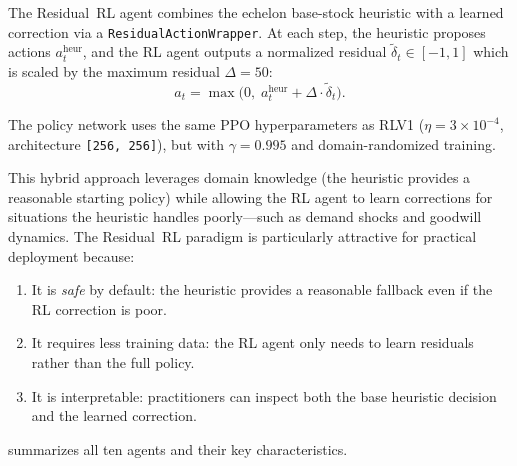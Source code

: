 The Residual~RL agent combines the echelon base-stock heuristic with a
learned correction via a \texttt{ResidualActionWrapper}. At each step,
the heuristic proposes actions $a_t^{\text{heur}}$, and the RL agent
outputs a normalized residual $\tilde{\delta}_t \in [-1, 1]$ which is
scaled by the maximum residual $\Delta = 50$:
\begin{equation}\label{eq:residual}
  a_t = \max\bigl(0,\; a_t^{\text{heur}} + \Delta \cdot \tilde{\delta}_t\bigr).
\end{equation}

The policy network uses the same PPO hyperparameters as RLV1
($\eta = 3 \times 10^{-4}$, architecture \texttt{[256,~256]}),
but with $\gamma = 0.995$ and domain-randomized training.

This hybrid approach leverages domain knowledge (the heuristic
provides a reasonable starting policy) while allowing the RL agent to
learn corrections for situations the heuristic handles poorly---such as
demand shocks and goodwill dynamics. The Residual~RL paradigm is
particularly attractive for practical deployment because:
\begin{enumerate}
  \item It is \emph{safe} by default: the heuristic provides a
        reasonable fallback even if the RL correction is poor.
  \item It requires less training data: the RL agent only needs to
        learn residuals rather than the full policy.
  \item It is interpretable: practitioners can inspect both the base
        heuristic decision and the learned correction.
\end{enumerate}

 summarizes all ten agents and their key
characteristics.

